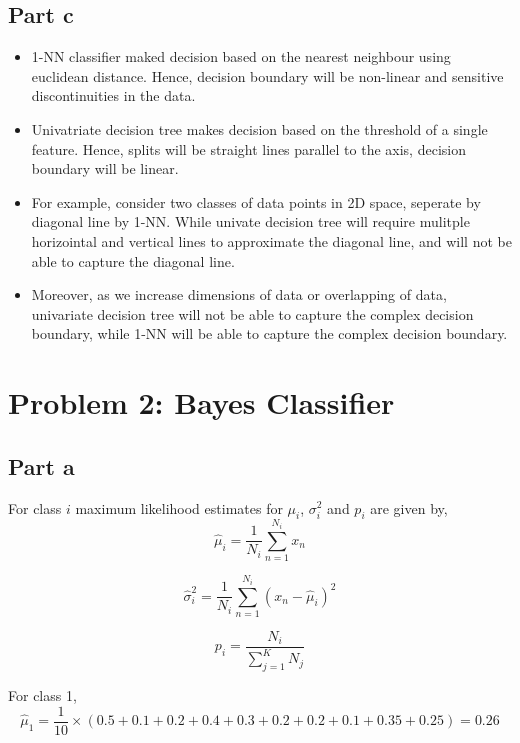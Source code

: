\documentclass[12pt]{article}
\begin{document}
\subsection*{Part c}
\begin{itemize}
    \item 1-NN classifier maked decision based on the nearest neighbour using euclidean distance.
            Hence, decision boundary will be non-linear and sensitive discontinuities in the data.
    \item Univatriate decision tree makes decision based on the threshold of a single feature.
            Hence, splits will be straight lines parallel to the axis, decision boundary will be linear.
    \item For example, consider two classes of data points in 2D space, seperate by diagonal line by 1-NN. 
            While univate decision tree will require mulitple horizointal and vertical lines to approximate the diagonal line, 
            and will not be able to capture the diagonal line.
    \item Moreover, as we increase dimensions of data or overlapping of data, univariate decision tree will not be able
            to capture the complex decision boundary, while 1-NN will be able to capture the complex decision boundary.
\end{itemize}

\section*{Problem 2: Bayes Classifier}
\subsection*{Part a}

For class $i$ maximum likelihood estimates for $\mu_i$, $\sigma^2_i$ and $p_i$ are given by,  
\begin{equation}
    \hat{\mu}_i = \frac{1}{N_i} \sum_{n=1}^{N_i} x_n
\end{equation}

\begin{equation}
    \hat{\sigma}^2_i = \frac{1}{N_i} \sum_{n=1}^{N_i} (x_n - \hat{\mu}_i)^2
\end{equation}

\begin{equation}
    {p}_i = \frac{N_i}{\sum_{j=1}^{K} N_j}
\end{equation}

For class 1, 
\begin{equation}
    \hat{\mu}_1 = \frac{1}{10} \times (0.5 + 0.1 + 0.2 + 0.4 + 0.3 + 0.2 + 0.2 + 0.1 + 0.35 + 0.25) = 0.26
    \nonumber
\end{equation}
\end{document}
